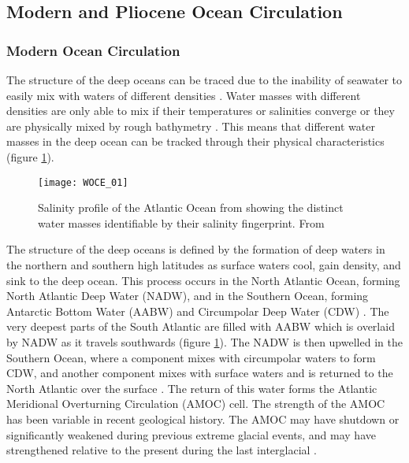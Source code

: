\subsection{Modern and Pliocene Ocean Circulation}

\subsubsection{Modern Ocean Circulation}

The structure of the deep oceans can be traced due to the inability of seawater to easily mix with waters of different densities \citep{brownChapterAtmosphereOcean2001}. Water masses with different densities are only able to mix if their temperatures or salinities converge or they are physically mixed by rough bathymetry \citep{furueEffectsPacificDiapycnal2005}.  This means that different water masses in the deep ocean can be tracked through their physical characteristics (figure \ref{fig:WOCE_01}).

\begin{figure}[h]
    \centering
    \texttt{[image: WOCE\_01]}
    \caption{Salinity profile of the Atlantic Ocean from  showing the distinct water masses identifiable by their salinity fingerprint. From \citet{schlitzerElectronicAtlasWOCE2000}}
    \label{fig:WOCE_01}
\end{figure}

The structure of the deep oceans is defined by the formation of deep waters in the northern and southern high latitudes as surface waters cool, gain density, and sink to the deep ocean. This process occurs in the North Atlantic Ocean, forming North Atlantic Deep Water (NADW), and in the Southern Ocean, forming Antarctic Bottom Water (AABW) and Circumpolar Deep Water (CDW) \citep{talleyChapterAtlanticOcean2011}. The very deepest parts of the South Atlantic are filled with AABW which is overlaid by NADW as it travels southwards (figure \ref{fig:WOCE_01}). The NADW is then upwelled in the Southern Ocean, where a component mixes with circumpolar waters to form CDW, and another component mixes with surface waters and is returned to the North Atlantic over the surface \citep{talleyClosureGlobalOverturning2013}. The return of this water forms the Atlantic Meridional Overturning Circulation (AMOC) cell. The strength of the AMOC has been variable in recent geological history. The AMOC may have shutdown \citep{broeckerOriginNorthernAtlantic1992} or significantly weakened \citep{oppoWhatBenthicD13C2015} during previous extreme glacial events, and may have strengthened relative to the present during the last interglacial \citep{guihouEnhancedAtlanticMeridional2011}.

